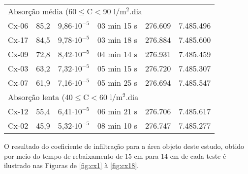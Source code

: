 \begin{longtable}{@{\hspace{1cm}} cc cc cc}
	\multicolumn{6}{l}{Absorção média (60$\leq$C$<$90 l/m$^2$.dia}	\\\cmidrule{1-2}
Cx-06 &85,2& 9,86$\cdot10^{-5}$ & 03 min 15 s &276.609&7.485.496\\ 
Cx-17 &84,5& 9,78$\cdot10^{-5}$ & 03 min 18 s &276.884&7.485.600\\ 
Cx-09 &72,8& 8,42$\cdot10^{-5}$ & 04 min 14 s &276.931&7.485.459\\ 
Cx-03 &63,2& 7,32$\cdot10^{-5}$ & 05 min 15 s &276.720&7.485.307\\ 
Cx-07 &61,9& 7,16$\cdot10^{-5}$ & 05 min 25 s &276.694&7.485.547\\ 

	\multicolumn{6}{l}{Absorção lenta (40$\leq$C$<$60 l/m$^2$.dia}	\\\cmidrule{1-2}
Cx-12 &55,4& 6,41$\cdot10^{-5}$ & 06 min 21 s &276.706&7.485.617\\ 
Cx-02 &45,9& 5,32$\cdot10^{-5}$ & 08 min 10 s &276.747&7.485.277\\ 

\end{longtable}

O resultado do coeficiente de infiltração para a área objeto deste 
estudo, obtido por meio do tempo de rebaixamento de 15 cm para 14 cm 
de cada teste é ilustrado nas Figuras de \ref{fig:cx1} à 
\ref{fig:cx18}.

